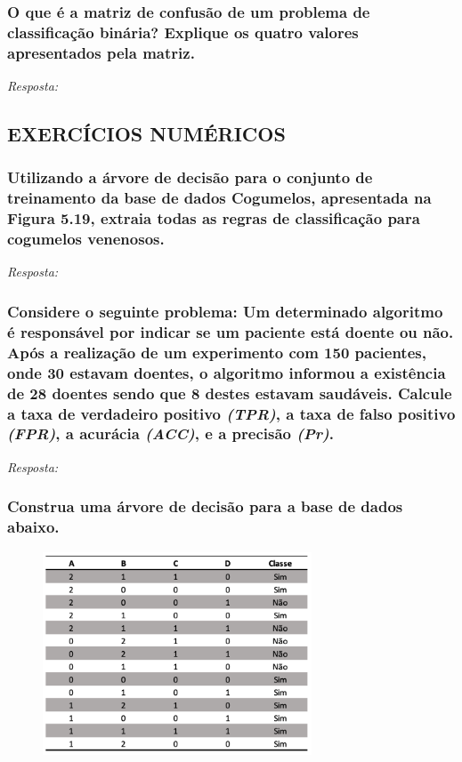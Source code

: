 \documentclass{article}
\begin{document}
\subsubsection{O que é a matriz de confusão de um problema de classificação binária? Explique os quatro valores apresentados pela matriz.}
\textit{Resposta:} 

\subsection{EXERCÍCIOS NUMÉRICOS}

\subsubsection{Utilizando a árvore de decisão para o conjunto de treinamento da base de dados Cogumelos, apresentada na Figura 5.19, extraia todas as regras de classificação para cogumelos venenosos.}
\textit{Resposta:} 

\subsubsection{Considere o seguinte problema: Um determinado algoritmo é responsável por indicar se um paciente está doente ou não. Após a realização de um experimento com 150 pacientes, onde 30 estavam doentes, o algoritmo informou a existência de 28 doentes sendo que 8 destes estavam saudáveis. Calcule a taxa de verdadeiro positivo \textit{(TPR)}, a taxa de falso positivo \textit{(FPR)}, a acurácia  \textit{(ACC)}, e a precisão \textit{(Pr)}.}
\textit{Resposta:} 

\subsubsection{Construa uma árvore de decisão para a base de dados abaixo.}
\begin{figure}[H]
    \centering 
    \includegraphics[width=8cm]{tab-5-2-3.png} 
  \end{figure}
\end{document}
